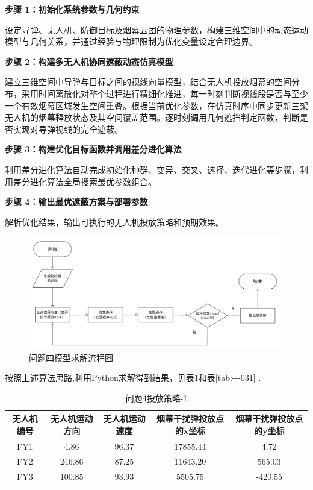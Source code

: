 \documentclass[../main.tex]{subfiles}
\begin{document}

\noindent \textbf{步骤 1：初始化系统参数与几何约束}

设定导弹、无人机、防御目标及烟幕云团的物理参数，构建三维空间中的动态运动模型与几何关系，并通过经验与物理限制为优化变量设定合理边界。

\noindent \textbf{步骤 2：构建多无人机协同遮蔽动态仿真模型} 

建立三维空间中导弹与目标之间的视线向量模型，结合无人机投放烟幕的空间分布，采用时间离散化对整个过程进行精细化推进，每一时刻判断视线段是否与至少一个有效烟幕区域发生空间重叠。根据当前优化参数，在仿真时序中同步更新三架无人机的烟幕释放状态及其空间覆盖范围。逐时刻调用几何遮挡判定函数，判断是否实现对导弹视线的完全遮蔽。

\noindent \textbf{步骤 3：构建优化目标函数并调用差分进化算法} 

利用差分进化算法自动完成初始化种群、变异、交叉、选择、迭代进化等步骤，利用差分进化算法全局搜索最优参数组合。


\noindent \textbf{步骤 4：输出最优遮蔽方案与部署参数} 

解析优化结果，输出可执行的无人机投放策略和预期效果。

\begin{figure}[H]
\centering
\includegraphics[scale=0.35]{问题4流程图.png}
\caption{问题四模型求解流程图}
\label{图...---2}
\end{figure}

按照上述算法思路,利用Python求解得到结果，见表\ref{tab:--001}和表\ref{tab:---031} .

\begin{table}[H]
\caption{问题4投放策略-1}
\label{tab:--001} 
\centering
\begin{small}
\begin{tabular}{ccccc}
\toprule[1.5pt]
无人机编号 &无人机运动方向 & 无人机运动速度  & 烟幕干扰弹投放点的x坐标& 烟幕干扰弹投放点的y坐标 \\
\midrule[1pt]
FY1 & 4.86             &  96.37                    & 17855.44                    & 4.72     \\            
FY2 & 246.86           &  87.25                    & 11643.20                    & 565.03      \\           
FY3 & 100.85           &  93.93                    & 5505.75                    & -420.55      \\           
\bottomrule[1.5pt]
\end{tabular}
\end{small}
\end{table}
\end{document}
